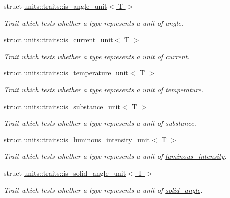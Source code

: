 \begin{DoxyCompactItemize}
struct \hyperlink{structunits_1_1traits_1_1is__angle__unit}{units\+::traits\+::is\+\_\+angle\+\_\+unit$<$ T $>$}
\begin{DoxyCompactList}\small\item\em Trait which tests whether a type represents a unit of angle. \end{DoxyCompactList}\item 
struct \hyperlink{structunits_1_1traits_1_1is__current__unit}{units\+::traits\+::is\+\_\+current\+\_\+unit$<$ T $>$}
\begin{DoxyCompactList}\small\item\em Trait which tests whether a type represents a unit of current. \end{DoxyCompactList}\item 
struct \hyperlink{structunits_1_1traits_1_1is__temperature__unit}{units\+::traits\+::is\+\_\+temperature\+\_\+unit$<$ T $>$}
\begin{DoxyCompactList}\small\item\em Trait which tests whether a type represents a unit of temperature. \end{DoxyCompactList}\item 
struct \hyperlink{structunits_1_1traits_1_1is__substance__unit}{units\+::traits\+::is\+\_\+substance\+\_\+unit$<$ T $>$}
\begin{DoxyCompactList}\small\item\em Trait which tests whether a type represents a unit of substance. \end{DoxyCompactList}\item 
struct \hyperlink{structunits_1_1traits_1_1is__luminous__intensity__unit}{units\+::traits\+::is\+\_\+luminous\+\_\+intensity\+\_\+unit$<$ T $>$}
\begin{DoxyCompactList}\small\item\em Trait which tests whether a type represents a unit of \hyperlink{namespaceunits_1_1luminous__intensity}{luminous\+\_\+intensity}. \end{DoxyCompactList}\item 
struct \hyperlink{structunits_1_1traits_1_1is__solid__angle__unit}{units\+::traits\+::is\+\_\+solid\+\_\+angle\+\_\+unit$<$ T $>$}
\begin{DoxyCompactList}\small\item\em Trait which tests whether a type represents a unit of \hyperlink{namespaceunits_1_1solid__angle}{solid\+\_\+angle}. \end{DoxyCompactList}\item 

\end{DoxyCompactItemize}

